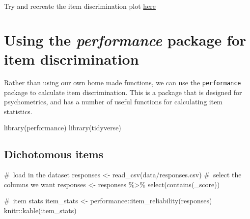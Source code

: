 \documentclass[
  letterpaper,
  DIV=11,
  numbers=noendperiod]{scrreprt}
\newenvironment{Shaded}{\begin{snugshade}}{\end{snugshade}}
\newcommand{\CommentTok}[1]{\textcolor[rgb]{0.37,0.37,0.37}{#1}}
\newcommand{\FunctionTok}[1]{\textcolor[rgb]{0.28,0.35,0.67}{#1}}
\newcommand{\NormalTok}[1]{\textcolor[rgb]{0.00,0.23,0.31}{#1}}
\newcommand{\OtherTok}[1]{\textcolor[rgb]{0.00,0.23,0.31}{#1}}
\newcommand{\SpecialCharTok}[1]{\textcolor[rgb]{0.37,0.37,0.37}{#1}}
\newcommand{\StringTok}[1]{\textcolor[rgb]{0.13,0.47,0.30}{#1}}
\begin{document}
Try and recreate the item discrimination plot
\href{https://www.ncbi.nlm.nih.gov/pmc/articles/PMC4096146/}{here}

\hypertarget{using-the-performance-package-for-item-discrimination}{%
\chapter{\texorpdfstring{Using the \emph{performance} package for item
discrimination}{Using the performance package for item discrimination}}\label{using-the-performance-package-for-item-discrimination}}

Rather than using our own home made functions, we can use the
\texttt{performance} package to calculate item discrimination. This is a
package that is designed for psychometrics, and has a number of useful
functions for calculating item statistics.

\begin{Shaded}
\begin{Highlighting}[]
\FunctionTok{library}\NormalTok{(performance)}
\FunctionTok{library}\NormalTok{(tidyverse)}
\end{Highlighting}
\end{Shaded}

\hypertarget{dichotomous-items}{%
\section{Dichotomous items}\label{dichotomous-items}}

\begin{Shaded}
\begin{Highlighting}[]
\CommentTok{\# load in the dataset}
\NormalTok{responses }\OtherTok{\textless{}{-}} \FunctionTok{read\_csv}\NormalTok{(}\StringTok{\textquotesingle{}data/responses.csv\textquotesingle{}}\NormalTok{)}
\CommentTok{\# select the columns we want}
\NormalTok{responses }\OtherTok{\textless{}{-}}\NormalTok{ responses }\SpecialCharTok{\%\textgreater{}\%} \FunctionTok{select}\NormalTok{(}\FunctionTok{contains}\NormalTok{(}\StringTok{\textquotesingle{}\_score\textquotesingle{}}\NormalTok{)) }
\end{Highlighting}
\end{Shaded}

\begin{Shaded}
\begin{Highlighting}[]
\CommentTok{\# item stats}
\NormalTok{item\_stats }\OtherTok{\textless{}{-}}\NormalTok{ performance}\SpecialCharTok{::}\FunctionTok{item\_reliability}\NormalTok{(responses)}
\NormalTok{knitr}\SpecialCharTok{::}\FunctionTok{kable}\NormalTok{(item\_stats)}
\end{Highlighting}
\end{Shaded}
\end{document}
